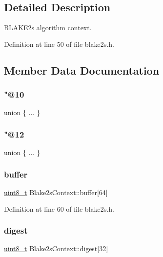 \subsection{Detailed Description}
B\+L\+A\+K\+E2s algorithm context. 

Definition at line 50 of file blake2s.\+h.



\subsection{Member Data Documentation}
\mbox{\label{structBlake2sContext_a381302786ab27c4d357bad6acd498074}} 
\subsubsection{\texorpdfstring{"@10}{@10}}
{\footnotesize\ttfamily union \{ ... \} }

\mbox{\label{structBlake2sContext_aabe14513ff3fe1338d3de3a2f515159b}} 
\subsubsection{\texorpdfstring{"@12}{@12}}
{\footnotesize\ttfamily union \{ ... \} }

\mbox{\label{structBlake2sContext_a2d534fac8f53f3181220a31a2e1257a8}} 
\subsubsection{\texorpdfstring{buffer}{buffer}}
{\footnotesize\ttfamily \hyperlink{stdint_8h_aba7bc1797add20fe3efdf37ced1182c5}{uint8\+\_\+t} Blake2s\+Context\+::buffer\mbox{[}64\mbox{]}}



Definition at line 60 of file blake2s.\+h.

\mbox{\label{structBlake2sContext_add237f41dfbeda19b07ae437331e69b1}} 
\subsubsection{\texorpdfstring{digest}{digest}}
{\footnotesize\ttfamily \hyperlink{stdint_8h_aba7bc1797add20fe3efdf37ced1182c5}{uint8\+\_\+t} Blake2s\+Context\+::digest\mbox{[}32\mbox{]}}



